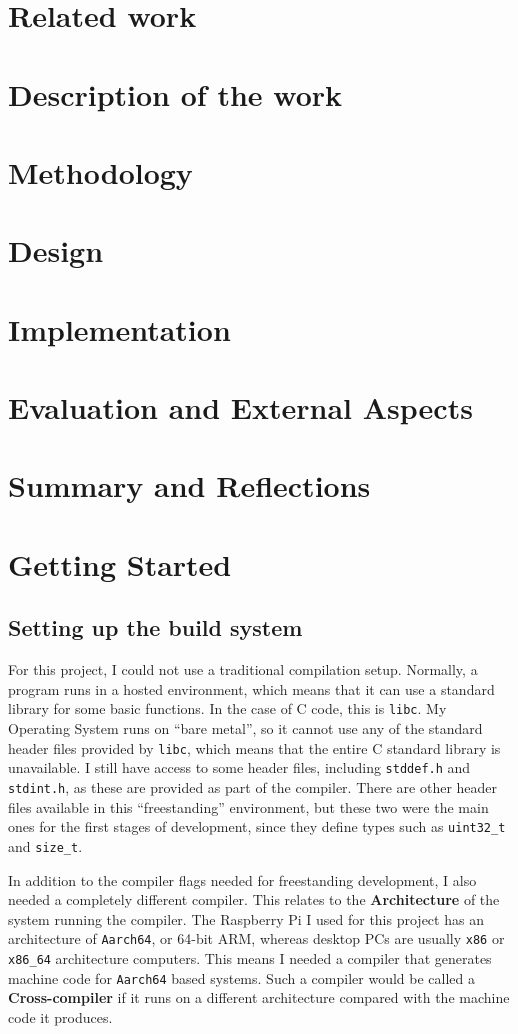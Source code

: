\documentclass{article}
\begin{document}
\section{Related work}
\section{Description of the work}
\section{Methodology}
\section{Design}
\section{Implementation}
\section{Evaluation and External Aspects}
\section{Summary and Reflections}

\clearpage
\section{Getting Started}
\subsection{Setting up the build system}
For this project, I could not use a traditional compilation setup. Normally, a
program runs in a hosted environment, which means that it can use a standard
library for some basic functions. In the case of C code, this is \texttt{libc}.
My Operating System runs on ``bare metal'', so it cannot use any of the
standard header files provided by \texttt{libc}, which means that the entire C
standard library is unavailable. I still have access to some header files,
including \texttt{stddef.h} and \texttt{stdint.h}, as these are provided as
part of the compiler. There are other header files available in this
``freestanding'' environment, but these two were the main ones for the first
stages of development, since they define types such as \texttt{uint32\_t} and
\texttt{size\_t}.

In addition to the compiler flags needed for freestanding development, I also
needed a completely different compiler. This relates to the
\textbf{Architecture} of the system running the compiler. The Raspberry Pi I
used for this project has an architecture of \texttt{Aarch64}, or 64-bit ARM,
whereas desktop PCs are usually \texttt{x86} or \texttt{x86\_64} architecture
computers. This means I needed a compiler that generates machine code for
\texttt{Aarch64} based systems. Such a compiler would be called a
\textbf{Cross-compiler} if it runs on a different architecture compared with
the machine code it produces.
\end{document}
